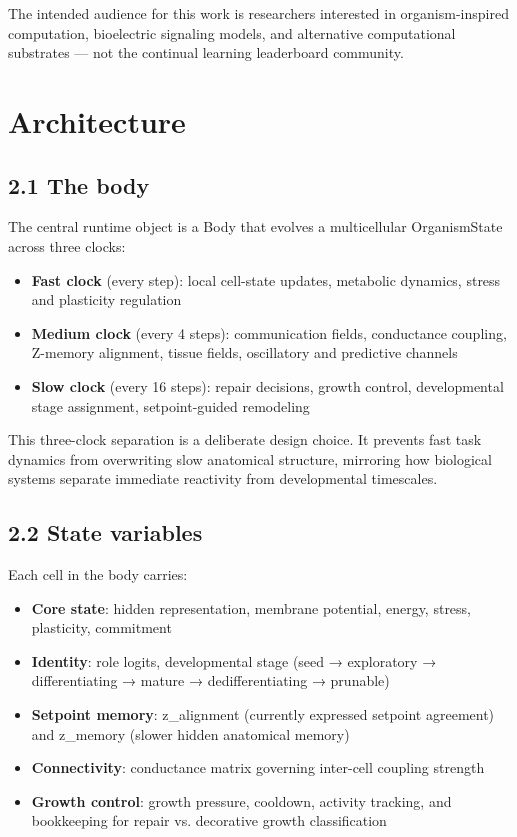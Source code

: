 \documentclass[11pt,a4paper]{article}
\begin{document}
The intended audience for this work is researchers interested in organism-inspired computation, bioelectric signaling models, and alternative computational substrates --- not the continual learning leaderboard community.

\section{Architecture}

\subsection{2.1 The body}
The central runtime object is a Body that evolves a multicellular OrganismState across three clocks:
\begin{itemize}[leftmargin=*,itemsep=3pt]
\item \textbf{Fast clock} (every step): local cell-state updates, metabolic dynamics, stress and plasticity regulation
\item \textbf{Medium clock} (every 4 steps): communication fields, conductance coupling, Z-memory alignment, tissue fields, oscillatory and predictive channels
\item \textbf{Slow clock} (every 16 steps): repair decisions, growth control, developmental stage assignment, setpoint-guided remodeling
\end{itemize}

This three-clock separation is a deliberate design choice. It prevents fast task dynamics from overwriting slow anatomical structure, mirroring how biological systems separate immediate reactivity from developmental timescales.

\subsection{2.2 State variables}
Each cell in the body carries:
\begin{itemize}[leftmargin=*,itemsep=3pt]
\item \textbf{Core state}: hidden representation, membrane potential, energy, stress, plasticity, commitment
\item \textbf{Identity}: role logits, developmental stage (seed → exploratory → differentiating → mature → dedifferentiating → prunable)
\item \textbf{Setpoint memory}: z\_alignment (currently expressed setpoint agreement) and z\_memory (slower hidden anatomical memory)
\item \textbf{Connectivity}: conductance matrix governing inter-cell coupling strength
\item \textbf{Growth control}: growth pressure, cooldown, activity tracking, and bookkeeping for repair vs. decorative growth classification
\end{itemize}
\end{document}
